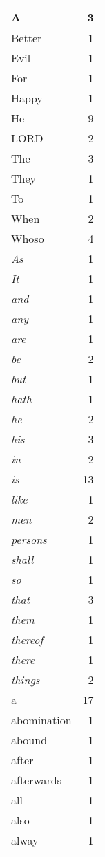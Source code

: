 \begin{center}
\begin{longtable}{l|r}
A & 3\\ \hline 
Better & 1\\ \hline 
Evil & 1\\ \hline 
For & 1\\ \hline 
Happy & 1\\ \hline 
He & 9\\ \hline 
LORD & 2\\ \hline 
The & 3\\ \hline 
They & 1\\ \hline 
To & 1\\ \hline 
When & 2\\ \hline 
Whoso & 4\\ \hline 
\emph{As} & 1\\ \hline 
\emph{It} & 1\\ \hline 
\emph{and} & 1\\ \hline 
\emph{any} & 1\\ \hline 
\emph{are} & 1\\ \hline 
\emph{be} & 2\\ \hline 
\emph{but} & 1\\ \hline 
\emph{hath} & 1\\ \hline 
\emph{he} & 2\\ \hline 
\emph{his} & 3\\ \hline 
\emph{in} & 2\\ \hline 
\emph{is} & 13\\ \hline 
\emph{like} & 1\\ \hline 
\emph{men} & 2\\ \hline 
\emph{persons} & 1\\ \hline 
\emph{shall} & 1\\ \hline 
\emph{so} & 1\\ \hline 
\emph{that} & 3\\ \hline 
\emph{them} & 1\\ \hline 
\emph{thereof} & 1\\ \hline 
\emph{there} & 1\\ \hline 
\emph{things} & 2\\ \hline 
a & 17\\ \hline 
abomination & 1\\ \hline 
abound & 1\\ \hline 
after & 1\\ \hline 
afterwards & 1\\ \hline 
all & 1\\ \hline 
also & 1\\ \hline 
alway & 1\\ \hline 

\end{longtable}
\end{center}
